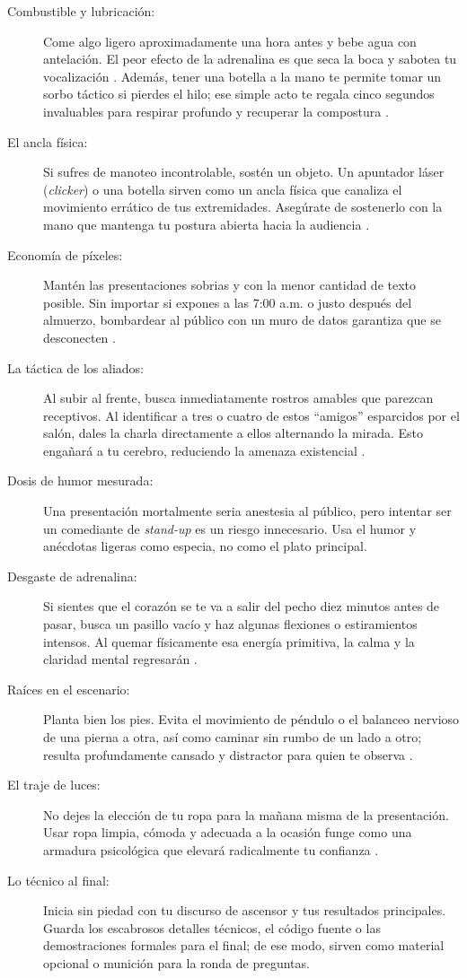 \begin{description}
	\item[Combustible y lubricación:]
	      Come algo ligero aproximadamente una hora antes y bebe agua con antelación.
	      El peor efecto de la adrenalina es que seca la boca y sabotea tu vocalización \cite{Anderson2016}.
	      Además, tener una botella a la mano te permite tomar un sorbo táctico si pierdes el hilo; ese simple acto te regala cinco segundos invaluables para respirar profundo y recuperar la compostura \cite{Hennessey2019}.
	\item[El ancla física:]
	      Si sufres de manoteo incontrolable, sostén un objeto.
	      Un apuntador láser (\emph{clicker}) o una botella sirven como un ancla física que canaliza el movimiento errático de tus extremidades.
	      Asegúrate de sostenerlo con la mano que mantenga tu postura abierta hacia la audiencia \cite{Hennessey2019}.
	\item[Economía de píxeles:]
	      Mantén las presentaciones sobrias y con la menor cantidad de texto posible.
	      Sin importar si expones a las 7:00 a.m. o justo después del almuerzo, bombardear al público con un muro de datos garantiza que se desconecten \cite{Hennessey2019}.
	\item[La táctica de los aliados:]
	      Al subir al frente, busca inmediatamente rostros amables que parezcan receptivos.
	      Al identificar a tres o cuatro de estos “amigos” esparcidos por el salón, dales la charla directamente a ellos alternando la mirada.
	      Esto engañará a tu cerebro, reduciendo la amenaza existencial \cite{Anderson2016}.
	\item[Dosis de humor mesurada:]
	      Una presentación mortalmente seria anestesia al público, pero intentar ser un comediante de \emph{stand-up} es un riesgo innecesario.
	      Usa el humor y anécdotas ligeras como especia, no como el plato principal.
	\item[Desgaste de adrenalina:]
	      Si sientes que el corazón se te va a salir del pecho diez minutos antes de pasar, busca un pasillo vacío y haz algunas flexiones o estiramientos intensos.
	      Al quemar físicamente esa energía primitiva, la calma y la claridad mental regresarán \cite{Anderson2016}.
	\item[Raíces en el escenario:]
	      Planta bien los pies.
	      Evita el movimiento de péndulo o el balanceo nervioso de una pierna a otra, así como caminar sin rumbo de un lado a otro; resulta profundamente cansado y distractor para quien te observa \cite{Anderson2016}.
	\item[El traje de luces:]
	      No dejes la elección de tu ropa para la mañana misma de la presentación.
	      Usar ropa limpia, cómoda y adecuada a la ocasión funge como una armadura psicológica que elevará radicalmente tu confianza \cite{Hennessey2019}.
	\item[Lo técnico al final:]
	      Inicia sin piedad con tu discurso de ascensor y tus resultados principales.
	      Guarda los escabrosos detalles técnicos, el código fuente o las demostraciones formales para el final; de ese modo, sirven como material opcional o munición para la ronda de preguntas.
\end{description}

